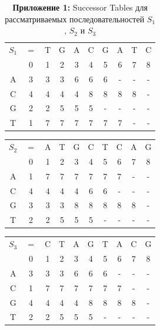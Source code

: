 \documentclass[a4paper,12pt]{extarticle}
\begin{document}
\begin{table}[h!]
  \centering
  \caption*{\textbf{Приложение 1: }Successor Tables для рассматриваемых последовательностей $S_{1}$, $S_{2}$ и $S_{3}$}
  \label{table:1}
  \renewcommand{\arraystretch}{1.5}
  \renewcommand{\tabcolsep}{0.25cm}
  \begin{tabular}{ c | c | c | c | c | c | c | c | c | c |}
    $S_{1}$ & $=$ & T & G & A & C & G & A & T & C \\
            & 0 & 1 & 2 & 3 & 4 & 5 & 6 & 7 & 8 \\
    \hline
    A & 3 & 3 & 3 & 6 & 6 & 6 & - & - & - \\
    \hline
    C & 4 & 4 & 4 & 4 & 8 & 8 & 8 & 8 & - \\
    \hline
    G & 2 & 2 & 5 & 5 & 5 & - & - & - & - \\
    \hline
    T & 1 & 7 & 7 & 7 & 7 & 7 & 7 & - & - \\
    \hline
  \end{tabular}
\end{table}
\begin{table}[h!]
  \hspace{-1.5cm}
  \centering
  \renewcommand{\arraystretch}{1.5}
  \renewcommand{\tabcolsep}{0.25cm}
  \begin{tabular}{ c | c | c | c | c | c | c | c | c | c |}
    $S_{2}$ & $=$ & A & T & G & C & T & C & A & G \\
            & 0 & 1 & 2 & 3 & 4 & 5 & 6 & 7 & 8 \\
    \hline
    A & 1 & 7 & 7 & 7 & 7 & 7 & 7 & - & - \\
    \hline
    C & 4 & 4 & 4 & 4 & 6 & 6 & - & - & - \\
    \hline
    G & 3 & 3 & 3 & 8 & 8 & 8 & 8 & 8 & - \\
    \hline
    T & 2 & 2 & 5 & 5 & 5 & - & - & - & - \\
    \hline
  \end{tabular}\hspace{1cm}
  \begin{tabular}{ c | c | c | c | c | c | c | c | c | c |}
    $S_{3}$ & $=$ & C & T & A & G & T & A & C & G \\
            & 0 & 1 & 2 & 3 & 4 & 5 & 6 & 7 & 8 \\
    \hline
    A & 3 & 3 & 3 & 6 & 6 & 6 & - & - & - \\
    \hline
    C & 1 & 7 & 7 & 7 & 7 & 7 & 7 & - & - \\
    \hline
    G & 4 & 4 & 4 & 4 & 8 & 8 & 8 & 8 & - \\
    \hline
    T & 2 & 2 & 5 & 5 & 5 & - & - & - & - \\
    \hline
  \end{tabular}
  \hspace{-1.5cm}
\end{table}
\end{document}
